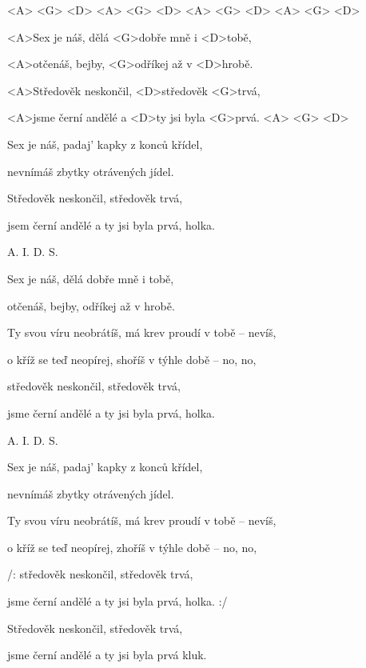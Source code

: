 

<A> <G> <D> <A> <G> <D> <A> <G> <D> <A> <G> <D>

\zs
<A>Sex je náš, dělá <G>dobře mně i <D>tobě,

<A>otčenáš, bejby, <G>odříkej až v <D>hrobě.

<A>Středověk neskončil, <D>středověk <G>trvá,

<A>jsme černí andělé a <D>ty jsi byla <G>prvá. <A> 
<G> <D>
\ks

\zs
Sex je náš, padaj' kapky z konců křídel,

nevnímáš zbytky otrávených jídel.

Středověk neskončil, středověk trvá,

jsem černí andělé a ty jsi byla prvá, holka.
\ks

A. I. D. S.

\zs
Sex je náš, dělá dobře mně i tobě,

otčenáš, bejby, odříkej až v hrobě.

Ty svou víru neobrátíš, má krev proudí v tobě -- nevíš,

o kříž se teď neopírej, shoříš v týhle době -- no, no,

středověk neskončil, středověk trvá,

jsme černí andělé a ty jsi byla prvá, holka.
\ks

A. I. D. S.

\zs
Sex je náš, padaj' kapky z konců křídel,

nevnímáš zbytky otrávených jídel.

Ty svou víru neobrátíš, má krev proudí v tobě -- nevíš,

o kříž se teď neopírej, zhoříš v týhle době -- no, no,

/: středověk neskončil, středověk trvá,

jsme černí andělé a ty jsi byla prvá, holka. :/

Středověk neskončil, středověk trvá,

jsme černí andělé a ty jsi byla prvá kluk.
\ks

\kp






